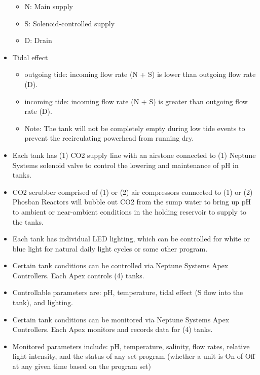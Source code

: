 \documentclass[]{book}
\providecommand{\tightlist}{%
  \setlength{\itemsep}{0pt}\setlength{\parskip}{0pt}}
\begin{document}
\begin{itemize}
  \begin{itemize}
  \tightlist
  \item
    N: Main supply
  \item
    S: Solenoid-controlled supply
  \item
    D: Drain\\
  \end{itemize}
\item
  Tidal effect

  \begin{itemize}
  \tightlist
  \item
    outgoing tide: incoming flow rate (N + S) is lower than outgoing
    flow rate (D).
  \item
    incoming tide: incoming flow rate (N + S) is greater than outgoing
    flow rate (D).
  \item
    Note: The tank will not be completely empty during low tide events
    to prevent the recirculating powerhead from running dry.\\
  \end{itemize}
\item
  Each tank has (1) CO2 supply line with an airstone connected to (1)
  Neptune Systems solenoid valve to control the lowering and maintenance
  of pH in tanks.\\
\item
  CO2 scrubber comprised of (1) or (2) air compressors connected to (1)
  or (2) Phosban Reactors will bubble out CO2 from the sump water to
  bring up pH to ambient or near-ambient conditions in the holding
  reservoir to supply to the tanks.\\
\item
  Each tank has individual LED lighting, which can be controlled for
  white or blue light for natural daily light cycles or some other
  program.\\
\item
  Certain tank conditions can be controlled via Neptune Systems Apex
  Controllers. Each Apex controls (4) tanks.\\
\item
  Controllable parameters are: pH, temperature, tidal effect (S flow
  into the tank), and lighting.\\
\item
  Certain tank conditions can be monitored via Neptune Systems Apex
  Controllers. Each Apex monitors and records data for (4) tanks.\\
\item
  Monitored parameters include: pH, temperature, salinity, flow rates,
  relative light intensity, and the status of any set program (whether a
  unit is On of Off at any given time based on the program set)
\end{itemize}
\end{document}
